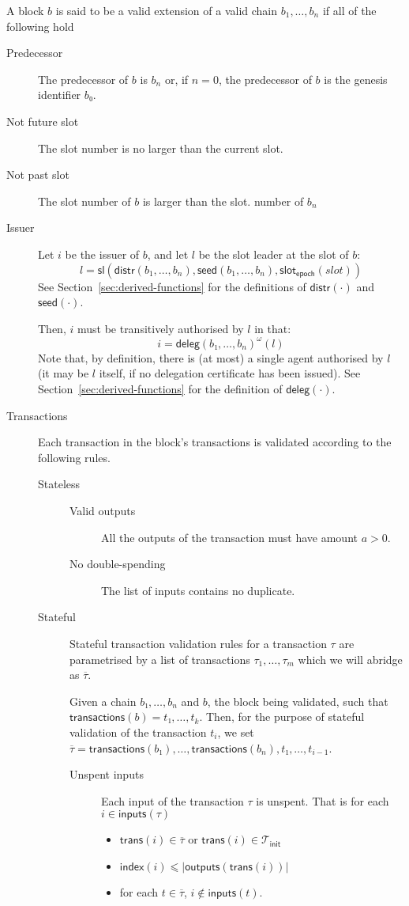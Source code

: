 \documentclass{article}
\newcommand{\improvement}[1]{\todo[linecolor=pink,backgroundcolor=pink!25,bordercolor=pink]{#1}}
\newcommand{\length}[1]{|#1|}
\newcommand{\txs}{\mathcal{T}}
\newcommand{\txinit}{\txs_{\!\mathsf{init}}}
\newcommand{\slotleader}[3]{\mathsf{sl}(#1,#2,#3)}
\newcommand{\transactions}[1]{\mathsf{transactions}(#1)}
\newcommand{\inputs}[1]{\mathsf{inputs}(#1)}
\newcommand{\outputs}[1]{\mathsf{outputs}(#1)}
\newcommand{\intrans}[1]{\mathsf{trans}(#1)}
\newcommand{\inindex}[1]{\mathsf{index}(#1)}
\newcommand{\transitivefix}[1]{{#1}^ω}
\newcommand{\delegations}[1]{\mathsf{deleg}(#1)}
\newcommand{\epochslot}[1]{\mathsf{slot}_\mathsf{epoch}(#1)}
\newcommand{\epochseed}[1]{\mathsf{seed}(#1)}
\newcommand{\epochdistribution}[1]{\mathsf{distr}(#1)}
\begin{document}
A block $b$ is said to be a valid extension of a valid chain
$b_1,…,b_n$ if all of the following hold
\begin{description}
\item[Predecessor] The predecessor of $b$ is $b_n$ or, if $n=0$, the predecessor
  of $b$ is the genesis identifier $b₀$.
\item[Not future slot] The slot number is no larger than the current
  slot.
\item[Not past slot] The slot number of $b$ is larger than the slot.
  number of $b_n$
\item[Issuer] Let $i$ be the issuer of $b$, and let $l$ be the slot
  leader at the slot of $b$:
  $$
  l = \slotleader{\epochdistribution{b_1,…,b_n}}{\epochseed{b_1,…,b_n}}{\epochslot{slot}}
  $$
  See Section~\ref{sec:derived-functions} for the definitions of
  $\epochdistribution{⋅}$ and $\epochseed{⋅}$.
  \improvement{this doesn't read too well, improve.}

  Then, $i$ must be transitively authorised by $l$ in that:
  $$
  i = \transitivefix{\delegations{b₁,…,b_n}}(l)
  $$
  Note that, by definition, there is (at most) a single agent
  authorised by $l$ (it may be $l$ itself, if no delegation certificate
  has been issued). See Section~\ref{sec:derived-functions} for the
  definition of $\delegations{⋅}$.
\item[Transactions] Each transaction in the block's transactions is
  validated according to the following rules.
  \begin{description}
  \item[Stateless]\hfill
    \begin{description}
    \item[Valid outputs] All the outputs of the transaction must have
      amount $a > 0$.
    \item[No double-spending] The list of inputs contains no duplicate.
    \end{description}
  \item[Stateful] Stateful transaction validation rules for a transaction $τ$
    are parametrised by a list of transactions $τ_1,…,τ_m$ which we will abridge
    as $\overline{τ}$.

    Given a chain $b₁,…,b_n$ and $b$, the block being validated, such
    that $\transactions{b}=t₁,…,t_k$. Then, for the purpose of
    stateful validation of the transaction $t_i$, we set
    $\overline{τ} = \transactions{b₁},…,\transactions{b_n},t₁,…,t_{i-1}$.
    \begin{description}
    \item[Unspent inputs] Each input of the transaction $τ$ is
      unspent. That is for each $i ∈ \inputs{τ}$
      \begin{itemize}
      \item $\intrans{i}∈\overline{τ}$ or $\intrans{i} ∈ \txinit$
      \item $\inindex{i} ⩽ \length{\outputs{\intrans{i}}}$
      \item for each $t ∈ \overline{τ}$, $i ∉ \inputs{t}$.
      \end{itemize}


\end{description}
\end{description}
\end{description}
\end{document}
